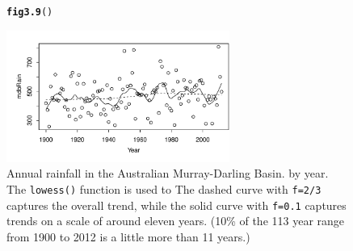 \documentclass[12pt, a4paper,  BCOR=8.25mm, DIV=15]{scrartcl}\usepackage[]{graphicx}\usepackage[]{color}
\makeatletter
\newcommand{\hlstd}[1]{\textcolor[rgb]{0.345,0.345,0.345}{#1}}%
\newcommand{\hlkwd}[1]{\textcolor[rgb]{0.737,0.353,0.396}{\textbf{#1}}}%
\newenvironment{kframe}{%
 \def\at@end@of@kframe{}%
 \ifinner\ifhmode%
  \def\at@end@of@kframe{\end{minipage}}%
  \begin{minipage}{\columnwidth}%
 \fi\fi%
 \def\FrameCommand##1{\hskip\@totalleftmargin \hskip-\fboxsep
 \colorbox{shadecolor}{##1}\hskip-\fboxsep
     \hskip-\linewidth \hskip-\@totalleftmargin \hskip\columnwidth}%
 \MakeFramed {\advance\hsize-\width
   \@totalleftmargin\z@ \linewidth\hsize
   \@setminipage}}%
 {\par\unskip\endMakeFramed%
 \at@end@of@kframe}
\newenvironment{knitrout}{}{} %
\newcommand{\txtt}[1]{{\texttt{#1}}}
\makeatother
\begin{document}
\begin{figure}
\begin{knitrout}
\color{fgcolor}\begin{kframe}
\begin{alltt}
\hlkwd{fig3.9}\hlstd{()}
\end{alltt}
\end{kframe}

{\centering \includegraphics[width=0.65\textwidth]{figure/exs-fig3_9e-1} 

}



\end{knitrout}
\caption{Annual rainfall in the Australian Murray-Darling Basin.
by year.  The \txtt{lowess()} function is used to
The dashed curve with \txtt{f=2/3} captures the
overall trend, while the solid curve with \txtt{f=0.1}
captures trends on a scale of around eleven years. (10\% of the 113 year
range from 1900 to 2012 is a little more than 11 years.)\label{fig:mdbRain}}
\end{figure}
\end{document}

